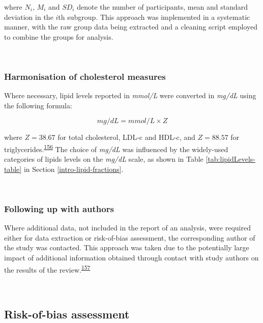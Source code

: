 \documentclass[a4paper, twoside]{templates/ociamthesis}
\begin{document}
where \(N_i\), \(M_i\) and \(SD_i\) denote the number of participants, mean and standard deviation in the \(i\)th subgroup. This approach was implemented in a systematic manner, with the raw group data being extracted and a cleaning script employed to combine the groups for analysis.

~

\hypertarget{harmonisation-of-cholesterol-measures}{%
\subsubsection{Harmonisation of cholesterol measures}\label{harmonisation-of-cholesterol-measures}}

Where necessary, lipid levels reported in \emph{mmol/L} were converted in \emph{mg/dL} using the following formula:

\begin{equation} 
  mg/dL = mmol/L \times{} Z
  \label{eq:lipidConversion}
\end{equation}

where \(Z = 38.67\) for total cholesterol, LDL-c and HDL-c, and \(Z = 88.57\) for triglycerides.\textsuperscript{\protect\hyperlink{ref-rugge2011}{156}} The choice of \emph{mg/dL} was influenced by the widely-used categories of lipids levels on the \emph{mg/dL} scale, as shown in Table \ref{tab:lipidLevels-table} in Section \ref{intro-lipid-fractions}.

~

\hypertarget{contacting-authors}{%
\subsubsection{Following up with authors}\label{contacting-authors}}

Where additional data, not included in the report of an analysis, were required either for data extraction or risk-of-bias assessment, the corresponding author of the study was contacted. This approach was taken due to the potentially large impact of additional information obtained through contact with study authors on the results of the review.\textsuperscript{\protect\hyperlink{ref-reynders2019}{157}}

~

\hypertarget{risk-of-bias}{%
\subsection{Risk-of-bias assessment}\label{risk-of-bias}}
\end{document}
